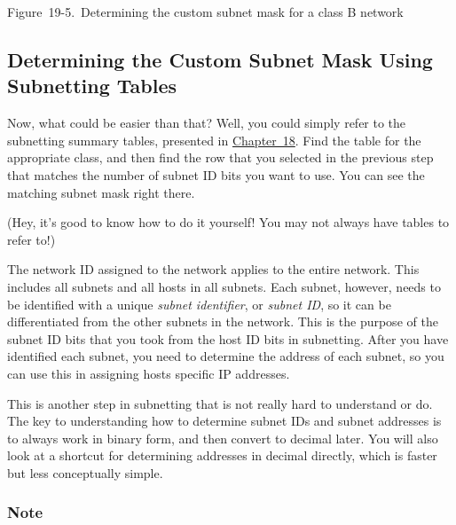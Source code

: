\documentclass[b5paper,11pt]{memoir}
\begin{document}
\protect\hypertarget{ch19s03.htmlux5cux23determining_the_custom_subnet_mask-id001}{}{}

\protect\hypertarget{ch19s03.htmlux5cux23I_mediaobject5_d1e20821}{}{}

Figure~19-5.~Determining the custom subnet mask for a class B network

\subsection[Determining the Custom Subnet Mask Using Subnetting
Tables]{\texorpdfstring{\protect\hypertarget{ch19s03.htmlux5cux23determining_the_custom_subnet_mask_using}{}{}Determining
the Custom Subnet Mask Using Subnetting
Tables}{Determining the Custom Subnet Mask Using Subnetting Tables}}

Now, what could be easier than that? Well, you could simply refer to the
subnetting summary tables, presented in
\protect\hyperlink{ch18.html}{Chapter~18}. Find the table for the
appropriate class, and then find the row that you selected in the
previous step that matches the number of subnet ID bits you want to use.
You can see the matching subnet mask right there.

(Hey, it's good to know how to do it yourself! You may not always have
tables to refer to!)

\protect\hypertarget{ch19s04.html}{}{}

The network ID assigned to the network applies to the entire network.
This includes all subnets and all hosts in all subnets. Each subnet,
however, needs to be identified with a unique {\emph{subnet
identifier}}, or {\emph{subnet ID}}, so it can be differentiated from
the other subnets in the network. This is the purpose of the subnet ID
bits that you took from the host ID bits in subnetting. After you have
identified each subnet, you need to determine the address of each
subnet, so you can use this in assigning hosts specific IP addresses.

This is another step in subnetting that is not really hard to understand
or do. The key to understanding how to determine subnet IDs and subnet
addresses is to always work in binary form, and then convert to decimal
later. You will also look at a shortcut for determining addresses in
decimal directly, which is faster but less conceptually simple.

\subsubsection[Note]{\texorpdfstring{\protect\hypertarget{ch19s04.htmlux5cux23note-78}{}{}Note}{Note}}
\end{document}
